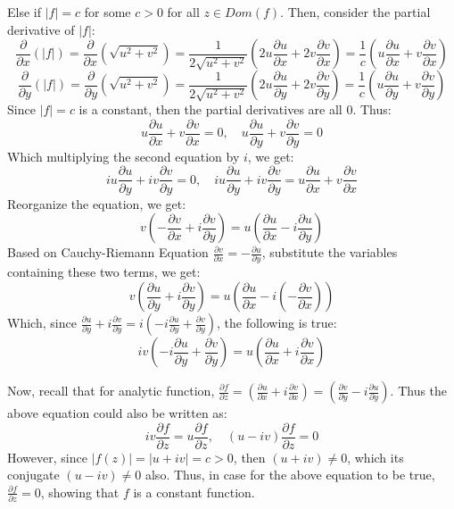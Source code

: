 \documentclass{article}
\begin{document}
Else if $|f|=c$ for some $c>0$ for all $z\in Dom(f)$. Then, consider the partial derivative of $|f|$:
$$\frac{\partial}{\partial x}(|f|)=\frac{\partial}{\partial x}(\sqrt{u^2+v^2})=\frac{1}{2\sqrt{u^2+v^2}}\left(2u\frac{\partial u}{\partial x}+2v\frac{\partial v}{\partial x}\right) = \frac{1}{c}\left(u\frac{\partial u}{\partial x}+v\frac{\partial v}{\partial x}\right)$$
$$\frac{\partial}{\partial y}(|f|)=\frac{\partial}{\partial y}(\sqrt{u^2+v^2})=\frac{1}{2\sqrt{u^2+v^2}}\left(2u\frac{\partial u}{\partial y}+2v\frac{\partial v}{\partial y}\right) = \frac{1}{c}\left(u\frac{\partial u}{\partial y}+v\frac{\partial v}{\partial y}\right)$$
Since $|f|=c$ is a constant, then the partial derivatives are all $0$. Thus:
$$u\frac{\partial u}{\partial x}+v\frac{\partial v}{\partial x}=0,\quad u\frac{\partial u}{\partial y}+v\frac{\partial v}{\partial y}=0$$
Which multiplying the second equation by $i$, we get:
$$iu\frac{\partial u}{\partial y}+iv\frac{\partial v}{\partial y}=0, \quad iu\frac{\partial u}{\partial y}+iv\frac{\partial v}{\partial y}=u\frac{\partial u}{\partial x}+v\frac{\partial v}{\partial x}$$
Reorganize the equation, we get:
$$v\left(-\frac{\partial v}{\partial x}+i\frac{\partial v}{\partial y}\right)=u\left(\frac{\partial u}{\partial x}-i\frac{\partial u}{\partial y}\right)$$
Based on Cauchy-Riemann Equation $\frac{\partial v}{\partial x} = -\frac{\partial u}{\partial y}$, substitute the variables containing these two terms, we get:
$$v\left(\frac{\partial u}{\partial y}+i\frac{\partial v}{\partial y}\right)=u\left(\frac{\partial u}{\partial x}-i\left(-\frac{\partial v}{\partial x}\right)\right)$$
Which, since $\frac{\partial u}{\partial y}+i\frac{\partial v}{\partial y} = i\left(-i\frac{\partial u}{\partial y}+\frac{\partial v}{\partial y}\right)$, the following is true:
$$iv\left(-i\frac{\partial u}{\partial y}+\frac{\partial v}{\partial y}\right)=u\left(\frac{\partial u}{\partial x}+i\frac{\partial v}{\partial x}\right)$$

Now, recall that for analytic function, $\frac{\partial f}{\partial z} = \left(\frac{\partial u}{\partial x}+i\frac{\partial v}{\partial x}\right) = \left(\frac{\partial v}{\partial y}-i\frac{\partial u}{\partial y}\right)$. Thus the above equation could also be written as:
$$iv\frac{\partial f}{\partial z}=u\frac{\partial f}{\partial z},\quad (u-iv)\frac{\partial f}{\partial z} = 0$$
However, since $|f(z)| = |u+iv| = c >0$, then $(u+iv) \neq 0$, which its conjugate $(u-iv) \neq 0$ also. Thus, in case for the above equation to be true, $\frac{\partial f}{\partial z} = 0$, showing that $f$ is a constant function.
\end{document}
